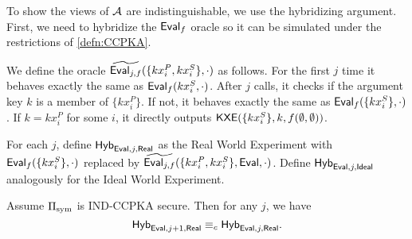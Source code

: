 To show the views of $\mathcal{A}$ are indistinguishable, we use the hybridizing argument. First, we need to hybridize the $\mathsf{Eval}_f$ oracle so it can be simulated under the restrictions of \cref{defn:CCPKA}. 
\begin{definition}
We define the oracle $\widetilde{\mathsf{Eval}_{j, f}}(\{kx_i^P, kx_i^S\}, \cdot)$ as follows. For the first $j$ time it behaves exactly the same as $\mathsf{Eval}_f(kx_i^S, \cdot)$. After $j$ calls, it checks if the argument key $k$ is a member of $\{kx_i^P\}$. If not, it behaves exactly the same as $\mathsf{Eval}_f(\{kx_i^S\}, \cdot)$. If $k = kx_i^P$ for some $i$, it directly outputs $\mathsf{KXE}(\{kx_i^S\}, k, f(\emptyset, \emptyset))$.

    For each $j$, define $\mathsf{Hyb}_{\mathsf{Eval}, j, \mathsf{Real}}$ as the Real World Experiment with $\mathsf{Eval}_f(\{kx_i^S\}, \cdot)$ replaced by $\widetilde{\mathsf{Eval}_{j, f}}(\{kx_i^P, kx_i^S\}, \mathsf{Eval}, \cdot)$. Define $\mathsf{Hyb}_{\mathsf{Eval}, j, \mathsf{Ideal}}$ analogously for the Ideal World Experiment. 
\end{definition}
\begin{lemma}
     Assume $\Pi_{\text{sym}}$ is IND-CCPKA secure. Then for any $j$, we have 
    $$\mathsf{Hyb}_{\mathsf{Eval}, j + 1, \mathsf{Real}} \equiv_c \mathsf{Hyb}_{\mathsf{Eval}, j, \mathsf{Real}}.$$
\end{lemma}

